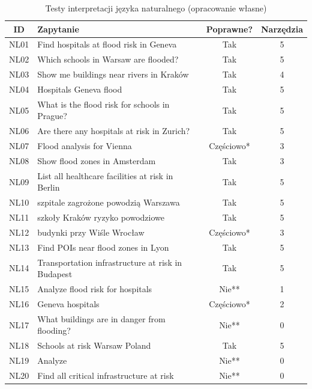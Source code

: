\begin{table}[H]
    \centering
    \caption{Testy interpretacji języka naturalnego (opracowanie własne)}
    \footnotesize
    \begin{tabular}{|c|p{7cm}|c|c|}
        \hline
        \textbf{ID} & \textbf{Zapytanie} & \textbf{Poprawne?} & \textbf{Narzędzia} \\
        \hline
        NL01 & Find hospitals at flood risk in Geneva & Tak & 5 \\
        \hline
        NL02 & Which schools in Warsaw are flooded? & Tak & 5 \\
        \hline
        NL03 & Show me buildings near rivers in Kraków & Tak & 4 \\
        \hline
        NL04 & Hospitals Geneva flood & Tak & 5 \\
        \hline
        NL05 & What is the flood risk for schools in Prague? & Tak & 5 \\
        \hline
        NL06 & Are there any hospitals at risk in Zurich? & Tak & 5 \\
        \hline
        NL07 & Flood analysis for Vienna & Częściowo* & 3 \\
        \hline
        NL08 & Show flood zones in Amsterdam & Tak & 3 \\
        \hline
        NL09 & List all healthcare facilities at risk in Berlin & Tak & 5 \\
        \hline
        NL10 & szpitale zagrożone powodzią Warszawa & Tak & 5 \\
        \hline
        NL11 & szkoły Kraków ryzyko powodziowe & Tak & 5 \\
        \hline
        NL12 & budynki przy Wiśle Wrocław & Częściowo* & 3 \\
        \hline
        NL13 & Find POIs near flood zones in Lyon & Tak & 5 \\
        \hline
        NL14 & Transportation infrastructure at risk in Budapest & Tak & 5 \\
        \hline
        NL15 & Analyze flood risk for hospitals & Nie** & 1 \\
        \hline
        NL16 & Geneva hospitals & Częściowo* & 2 \\
        \hline
        NL17 & What buildings are in danger from flooding? & Nie** & 0 \\
        \hline
        NL18 & Schools at risk Warsaw Poland & Tak & 5 \\
        \hline
        NL19 & Analyze & Nie** & 0 \\
        \hline
        NL20 & Find all critical infrastructure at risk & Nie** & 0 \\
        \hline
    \end{tabular}
    \label{tab:nl_tests}
\end{table}

